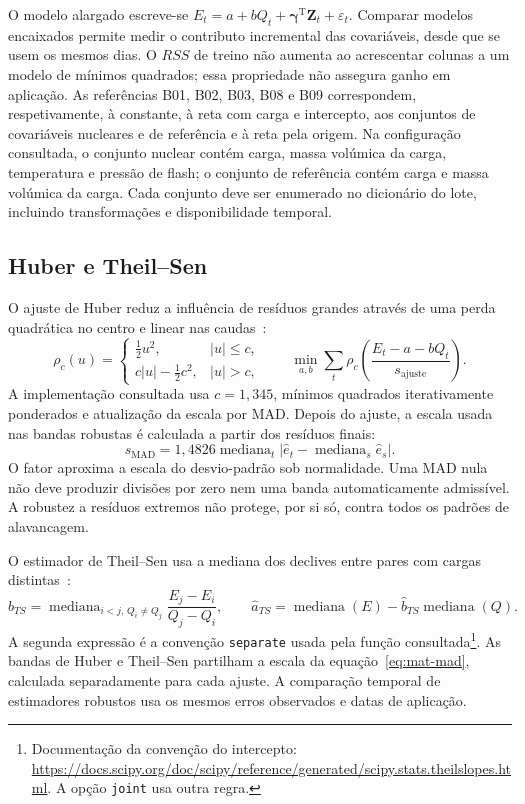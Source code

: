 O modelo alargado escreve-se $E_t=a+bQ_t+\boldsymbol\gamma^{\mathrm T}\boldsymbol Z_t+\varepsilon_t$. Comparar modelos encaixados permite medir o contributo incremental das covariáveis, desde que se usem os mesmos dias. O $RSS$ de treino não aumenta ao acrescentar colunas a um modelo de mínimos quadrados; essa propriedade não assegura ganho em aplicação. As referências B01, B02, B03, B08 e B09 correspondem, respetivamente, à constante, à reta com carga e intercepto, aos conjuntos de covariáveis nucleares e de referência e à reta pela origem. Na configuração consultada, o conjunto nuclear contém carga, massa volúmica da carga, temperatura e pressão de flash; o conjunto de referência contém carga e massa volúmica da carga. Cada conjunto deve ser enumerado no dicionário do lote, incluindo transformações e disponibilidade temporal.

\subsection{Huber e Theil--Sen}
\label{sec:mat-robustos}
O ajuste de Huber reduz a influência de resíduos grandes através de uma perda quadrática no centro e linear nas caudas~\parencite{Huber1964,HollandWelsch1977}:
\begin{equation}
\rho_c(u)=\begin{cases}\tfrac12u^2,&|u|\leq c,\\c|u|-\tfrac12c^2,&|u|>c,\end{cases}
\qquad \min_{a,b}\sum_t\rho_c\!\left(\frac{E_t-a-bQ_t}{s_{\mathrm{ajuste}}}\right).
\label{eq:mat-huber}
\end{equation}
A implementação consultada usa $c=1{,}345$, mínimos quadrados iterativamente ponderados e atualização da escala por MAD. Depois do ajuste, a escala usada nas bandas robustas é calculada a partir dos resíduos finais:
\begin{equation}
s_{\mathrm{MAD}}=1{,}4826\operatorname{mediana}_t
\left|\widehat e_t-\operatorname{mediana}_s\widehat e_s\right|.
\label{eq:mat-mad}
\end{equation}
O fator aproxima a escala do desvio-padrão sob normalidade. Uma MAD nula não deve produzir divisões por zero nem uma banda automaticamente admissível. A robustez a resíduos extremos não protege, por si só, contra todos os padrões de alavancagem.

O estimador de Theil--Sen usa a mediana dos declives entre pares com cargas distintas~\parencite{Sen1968}:
\begin{equation}
\widehat b_{TS}=\operatorname{mediana}_{i<j,\,Q_i\neq Q_j}
\frac{E_j-E_i}{Q_j-Q_i},
\qquad
\widehat a_{TS}=\operatorname{mediana}(E)-\widehat b_{TS}\operatorname{mediana}(Q).
\label{eq:mat-theil-sen}
\end{equation}
A segunda expressão é a convenção \texttt{separate} usada pela função consultada\footnote{Documentação da convenção do intercepto: \url{https://docs.scipy.org/doc/scipy/reference/generated/scipy.stats.theilslopes.html}. A opção \texttt{joint} usa outra regra.}. As bandas de Huber e Theil--Sen partilham a escala da equação~\ref{eq:mat-mad}, calculada separadamente para cada ajuste. A comparação temporal de estimadores robustos usa os mesmos erros observados e datas de aplicação.

